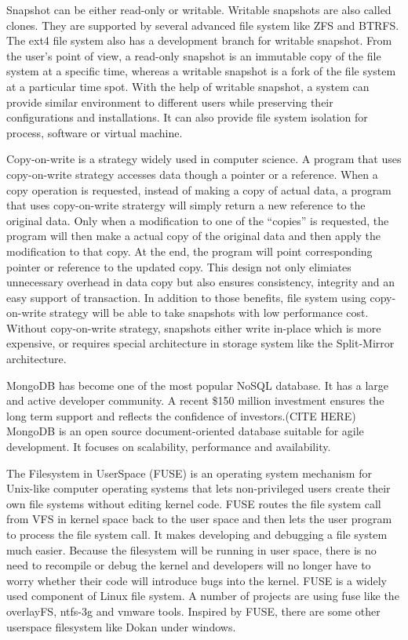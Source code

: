     Snapshot can be either read-only or writable. Writable snapshots are also called clones. They are supported by several advanced file system like ZFS and BTRFS. The ext4 file system also has a development branch for writable snapshot. From the user’s point of view, a read-only snapshot is an immutable copy of the file system at a specific time, whereas a writable snapshot is a fork of the file system at a particular time spot. With the help of writable snapshot, a system can provide similar environment to different users while preserving their configurations and installations. It can also provide file system isolation for process, software or virtual machine.

    Copy-on-write is a strategy widely used in computer science. A program that uses copy-on-write strategy accesses data though a pointer or a reference. When a copy operation is requested, instead of making a copy of actual data, a program that uses copy-on-write stratergy will simply return a new reference to the original data. Only when a modification to one of the ``copies'' is requested, the program will then make a actual copy of the original data and then apply the modification to that copy. At the end, the program will point corresponding pointer or reference to the updated copy. This design not only elimiates unnecessary overhead in data copy but also ensures consistency, integrity and an easy support of transaction. In addition to those benefits, file system using copy-on-write strategy will be able to take snapshots with low performance cost. Without copy-on-write strategy, snapshots either write in-place which is more expensive, or requires special architecture in storage system like the Split-Mirror architecture.

    MongoDB has become one of the most popular NoSQL database. It has a large and active developer community. A recent \$150 million investment ensures the long term support and reflects the confidence of investors.(CITE HERE)\cite{rsync_alg}  MongoDB is an open source document-oriented database suitable for agile development. It focuses on scalability, performance and availability.

    The Filesystem in UserSpace (FUSE) is an operating system mechanism for Unix-like computer operating systems that lets non-privileged users create their own file systems without editing kernel code. FUSE routes the file system call from VFS in kernel space back to the user space and then lets the user program to process the file system call. It makes developing and debugging a file system much easier. Because the filesystem will be running in user space, there is no need to recompile or debug the kernel and developers will no longer have to worry whether their code will introduce bugs into the kernel. FUSE is a widely used component of Linux file system. A number of projects are using fuse like the overlayFS, ntfs-3g and vmware tools. Inspired by FUSE, there are some other userspace filesystem like Dokan under windows.

